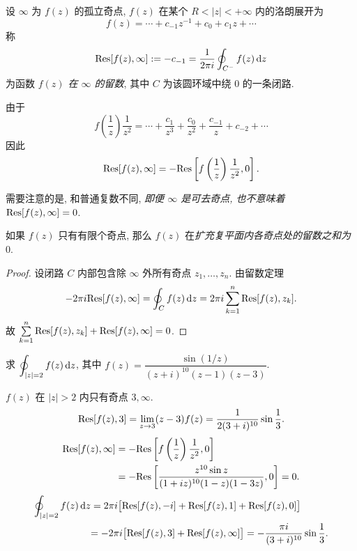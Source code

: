 \documentclass[nocolor,theme=doremi,lang=cn,11pt,chinese,twoside,openright,usesamecnt]{elegantbook}
\begin{document}
\begin{definition}
	设 $\infty$ 为 $f(z)$ 的孤立奇点, $f(z)$ 在某个 $R<|z|<+\infty$ 内的洛朗展开为
	\[f(z)=\cdots+c_{-1}z^{-1}+c_0+c_1z+\cdots\]
	称
	\[{\mathrm{Res}}[f(z),\infty]:=-c_{-1}=\frac1{2\pi i}\oint_{C^-}f(z)\,\mathrm{d} z\]
	为函数 \emph{$f(z)$ 在 $\infty$ 的留数}, 其中 $C$ 为该圆环域中绕 $0$ 的一条闭路.
\end{definition}

由于
\[f\left(\frac1z\right)\frac1{z^2}=\cdots+\frac{c_1}{z^3}+\frac{c_0}{z^2}+\frac{c_{-1}}z+c_{-2}+\cdots\]
因此 
	\[{\mathrm{Res}}[f(z),\infty]=-{\mathrm{Res}}\left[f\left(\frac1z\right)\frac1{z^2},0\right].\]

需要注意的是, 和普通复数不同, \emph{即便 $\infty$ 是可去奇点, 也不意味着 ${\mathrm{Res}}[f(z),\infty]=0$}.

\begin{theorem}
	如果 $f(z)$ 只有有限个奇点, 那么 $f(z)$ 在\emph{扩充复平面内各奇点处的留数之和为 $0$}.
\end{theorem}

\begin{proof}
	设闭路 $C$ 内部包含除 $\infty$ 外所有奇点 $z_1,\dots,z_n$.
	由留数定理
		\[-2\pi i{\mathrm{Res}}[f(z),\infty]=\oint_C f(z)\,\mathrm{d} z=2\pi i\sum_{k=1}^n{\mathrm{Res}}[f(z),z_k].\]
	故 $\sum\limits_{k=1}^n {\mathrm{Res}}[f(z),z_k]+{\mathrm{Res}}[f(z),\infty]=0$.
\end{proof}

\begin{example}
	求 $\displaystyle\oint_{|z|=2}f(z)\,\mathrm{d} z$, 其中 $f(z)=\dfrac{\sin(1/z)}{(z+i)^{10}(z-1)(z-3)}$.
\end{example}

\begin{solution}
	$f(z)$ 在 $|z|>2$ 内只有奇点 $3,\infty$.
{
	\[{\mathrm{Res}}[f(z),3]=\lim_{z\to3}(z-3)f(z)=\frac1{2(3+i)^{10}}\sin\frac13.\]
}
	\begin{align*}
		{\mathrm{Res}}[f(z),\infty]&=-{\mathrm{Res}}\left[f\left(\frac1z\right)\frac1{z^2},0\right]\\
		&=-{\mathrm{Res}}\left[\frac{z^{10}\sin z}{(1+iz)^{10}(1-z)(1-3z)},0\right]=0.
	\end{align*}
{
	\begin{align*}
		\oint_{|z|=2}f(z)\,\mathrm{d} z
		&=2\pi i\bigl[{\mathrm{Res}}[f(z),-i]+{\mathrm{Res}}[f(z),1]+{\mathrm{Res}}[f(z),0]\bigr]\\
		&{=-2\pi i\bigl[{\mathrm{Res}}[f(z),3]+{\mathrm{Res}}[f(z),\infty]\bigr]=-\frac{\pi i}{(3+i)^{10}}\sin\frac13.}
	\end{align*}
}
\end{solution}
\end{document}
